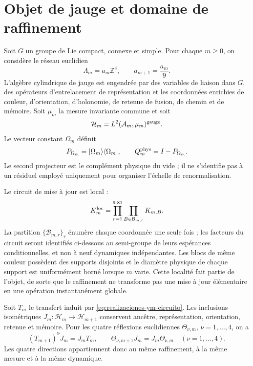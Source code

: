 \section*{Objet de jauge et domaine de raffinement}

Soit \(G\) un groupe de Lie compact, connexe et simple. Pour chaque
\(m\geq0\), on considère le réseau euclidien
\begin{equation}\label{eq:realizaciones-ym-red}
 \Lambda_m=a_m\mathbb Z^4,
 \qquad a_{m+1}=\frac{a_m}{9}.
\end{equation}
L'algèbre cylindrique de jauge est engendrée par des variables de liaison dans \(G\), des opérateurs d'entrelacement de représentation et les coordonnées enrichies de couleur, d'orientation, d'holonomie, de retenue de fusion, de chemin et de mémoire. Soit \(\mu_m\) la mesure invariante commune et soit
\[
 \mathcal H_m=L^2(\mathcal A_m,\mu_m)^{\rm gauge}.
\]
Le vecteur constant \(\Omega_m\) définit
\begin{equation}\label{eq:realizaciones-ym-proyectores}
 P_{\Omega_m}=|\Omega_m\rangle\langle\Omega_m|,
 \qquad Q_m^{\rm phys}=I-P_{\Omega_m}.
\end{equation}
Le second projecteur est le complément physique du vide ; il ne s’identifie pas
à un résiduel employé uniquement pour organiser l’échelle de
renormalisation.

Le circuit de mise à jour est local :
\begin{equation}\label{eq:realizaciones-ym-circuito}
 K_m^{\rm loc}
 =\prod_{r=1}^{9\cdot81}
   \prod_{B\in\mathcal B_{m,r}}K_{m,B}.
\end{equation}
La partition \(\{\mathcal B_{m,r}\}_r\) énumère chaque coordonnée une seule fois ; les facteurs
du circuit seront identifiés ci-dessous au semi-groupe de leurs espérances
conditionnelles, et non à neuf dynamiques indépendantes.
Les blocs de même couleur possèdent des supports disjoints et le diamètre physique
de chaque support est uniformément borné lorsque \(m\) varie. Cette localité
fait partie de l’objet, de sorte que le raffinement ne transforme pas une
mise à jour élémentaire en une opération instantanément globale.

Soit \(T_m\) le transfert induit par
\eqref{eq:realizaciones-ym-circuito}. Les inclusions isométriques
\(J_m:\mathcal H_m\to\mathcal H_{m+1}\) conservent ancêtre,
représentation, orientation, retenue et mémoire. Pour les quatre réflexions
euclidiennes \(\Theta_{\nu,m}\), \(\nu=1,\ldots,4\), on a
\begin{equation}\label{eq:realizaciones-ym-entrelazamiento}
 (T_{m+1})^9J_m=J_mT_m,
 \qquad
 \Theta_{\nu,m+1}J_m=J_m\Theta_{\nu,m}
 \quad(\nu=1,\ldots,4).
\end{equation}
Les quatre directions appartiennent donc au même raffinement, à la même mesure et à la même dynamique.

